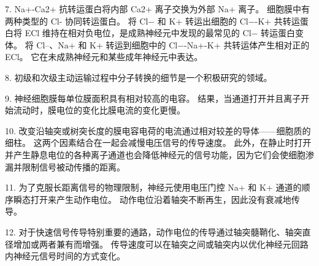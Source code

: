 7. Na+-Ca2+ 抗转运蛋白将内部 Ca2+ 离子交换为外部 Na+ 离子。 
细胞膜中有两种类型的 Cl- 协同转运蛋白。 
将 Cl− 和 K+ 转运出细胞的 Cl−-K+ 共转运蛋白将 ECl 维持在相对负电位，是成熟神经元中发现的最常见的 Cl− 转运蛋白变体。 
将 Cl–、Na+ 和 K+ 转运到细胞中的 Cl−-Na+-K+ 共转运体产生相对正的 ECl。 
它在未成熟神经元和某些成年神经元中表达。 


8. 初级和次级主动运输过程中分子转换的细节是一个积极研究的领域。 


9. 神经细胞膜每单位膜面积具有相对较高的电容。 
结果，当通道打开并且离子开始流动时，膜电位的变化比膜电流的变化更慢。 


10. 改变沿轴突或树突长度的膜电容电荷的电流通过相对较差的导体——细胞质的细柱。 
这两个因素结合在一起会减慢电压信号的传导速度。 
此外，在静止时打开并产生静息电位的各种离子通道也会降低神经元的信号功能，因为它们会使细胞渗漏并限制信号被动传播的距离。 


11. 为了克服长距离信号的物理限制，神经元使用电压门控 Na+ 和 K+ 通道的顺序瞬态打开来产生动作电位。 
动作电位沿着轴突不断再生，因此没有衰减地传导。 


12. 对于快速信号传导特别重要的通路，动作电位的传导通过轴突髓鞘化、轴突直径增加或两者兼有而增强。 
传导速度可以在轴突之间或轴突内以优化神经元回路内神经元信号时间的方式变化。


%







